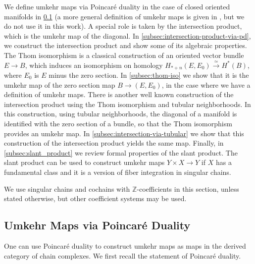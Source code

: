 \documentclass{scrartcl}
\theoremstyle{plain}
\theoremstyle{definition}
\newcommand{\Z}{\mathbb Z}
\newcommand{\quiso}{\simeq}
\let\xto\xrightarrow
\begin{document}
We define umkehr maps via Poincaré duality in the case of closed oriented manifolds in \cref{subsec:umkehr_maps_via_pd} (a more general definition of umkehr maps is given in \cite{cohen2009umkehr}, but we do not use it in this work). A special role is taken by the intersection product, which is the umkehr map of the diagonal. In \cref{subsec:intersection-product-via-pd}, we construct the intersection product and show some of its algebraic properties. The Thom isomorphism is a classical construction of an oriented vector bundle $E\to B$, which induces an isomorphism on homology $H_{*+n}(E, E_0) \xto{\quiso} H^{*}(B)$, where $E_0$ is $E$ minus the zero section. In \cref{subsec:thom-iso} we show that it is the umkehr map of the zero section map $B\to (E, E_0)$, in the case where we have a definition of umkehr maps. There is another well known construction of the intersection product using the Thom isomorphism and tubular neighborhoods. In this construction, using tubular neighborhoods, the diagonal of a manifold is identified with the zero section of a bundle, so that the Thom isomorphism provides an umkehr map. In \cref{subsec:intersection-via-tubular} we show that this construction of the intersection product yields the same map. Finally, in \cref{subsec:slant_product} we review formal properties of the slant product. The slant product can be used to construct umkehr maps $Y\times X\to Y$ if $X$ has a fundamental class and it is a version of fiber integration in singular chains. 

We use singular chains and cochains with $\Z$-coefficients in this section, unless stated otherwise, but other coefficient systems may be used.


\subsection{Umkehr Maps via Poincaré Duality} \label{subsec:umkehr_maps_via_pd}

One can use Poincaré duality to construct umkehr maps as maps in the derived category of chain complexes. We first recall the statement of Poincaré duality. 
\end{document}
